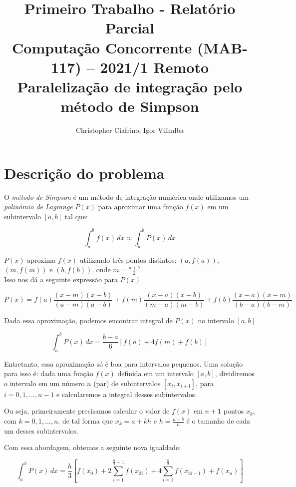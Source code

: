 \documentclass{article}
\title{\textbf{Primeiro Trabalho - Relatório Parcial}\\
\large Computação Concorrente (MAB-117) -- 2021/1 Remoto\\
\textbf{\Large Paralelização de integração pelo método de Simpson}}
\author{Christopher Ciafrino, Igor Vilhalba}
\begin{document}
\maketitle

\section{Descrição do problema}
O \emph{método de Simpson} é um método de integração numérica
onde utilizamos um \emph{polinômio de Lagrange} $P(x)$ para aproximar uma função
$ f(x)$ em um subintervalo $[a,b]$ tal que:

\begin{equation}
    \int_a^b{f(x)\,dx} \approx \int_a^b{P(x)\,dx}
\end{equation}

$P(x)$ aproxima $f(x)$ utilizando três pontos
distintos: $(a, f(a))$, $(m, f(m))$ e $(b, f(b))$, onde $m = \frac{a + b}{2}$.\\
Isso nos dá a seguinte expressão para $P(x)$

\begin{equation}
    P(x) = f(a)\frac{(x - m)(x - b)}{(a - m)(a - b)}
    + f(m)\frac{(x - a)(x - b)}{(m - a)(m - b)}
    + f(b)\frac{(x - a)(x - m)}{(b - a)(b - m)}
\end{equation}

Dada essa aproximação, podemos encontrar integral de $P(x)$ no intervalo $[a,b]$

\begin{equation}\label{eq:simpson}
    \int_a^b{P(x)\,dx} = \frac{b - a}{6}
    \left[
    f(a) + 4f(m) + f(b)
    \right]
\end{equation}

Entretanto, essa aproximação só é boa para intervalos
pequenos. Uma solução para isso é: dada uma função $f(x)$
definida em um intervalo $[a,b]$, dividiremos o intervalo em
um número $n$ (par) de subintervalos $[x_i,x_{i+1}]$, para
$i = 0, 1, ..., n - 1$ e calcularemos a integral desses
subintervalos.

Ou seja, primeiramente precisamos calcular o valor de $f(x)$
em $n + 1$ pontos $x_k$, com $k = 0,1,...,n$, de tal forma que $x_k = a + kh$ e $h = \frac{a - b}{n}$
é o tamanho de cada um desses subintervalos.

Com essa abordagem, obtemos a seguinte nova igualdade:

\begin{equation}\label{eq:simpson_composta}
    \int_a^b{P(x)\,dx} = \frac{h}{3}
    \left[
        f(x_0) + 2\sum_{i=1}^{\frac{n}{2}-1}{f(x_{2i})}
        + 4\sum_{i=1}^{\frac{n}{2}}{f(x_{2i - 1}) + f(x_n)}
    \right]
\end{equation}
\end{document}
